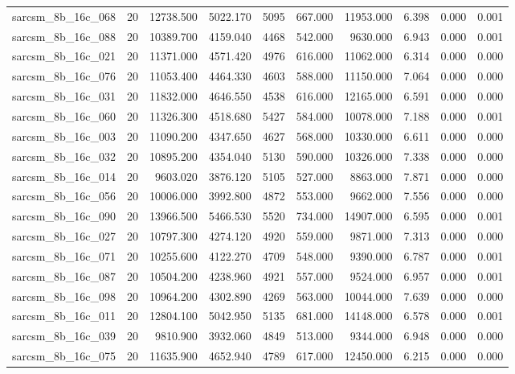 \begin{tabular}{lrrrrrrrrr}
sarcsm\_8b\_16c\_068 & 20 & 12738.500 & 5022.170 & 5095 & 667.000 & 11953.000 & 6.398 & 0.000 & 0.001 \\
sarcsm\_8b\_16c\_088 & 20 & 10389.700 & 4159.040 & 4468 & 542.000 & 9630.000 & 6.943 & 0.000 & 0.001 \\
sarcsm\_8b\_16c\_021 & 20 & 11371.000 & 4571.420 & 4976 & 616.000 & 11062.000 & 6.314 & 0.000 & 0.000 \\
sarcsm\_8b\_16c\_076 & 20 & 11053.400 & 4464.330 & 4603 & 588.000 & 11150.000 & 7.064 & 0.000 & 0.000 \\
sarcsm\_8b\_16c\_031 & 20 & 11832.000 & 4646.550 & 4538 & 616.000 & 12165.000 & 6.591 & 0.000 & 0.000 \\
sarcsm\_8b\_16c\_060 & 20 & 11326.300 & 4518.680 & 5427 & 584.000 & 10078.000 & 7.188 & 0.000 & 0.001 \\
sarcsm\_8b\_16c\_003 & 20 & 11090.200 & 4347.650 & 4627 & 568.000 & 10330.000 & 6.611 & 0.000 & 0.000 \\
sarcsm\_8b\_16c\_032 & 20 & 10895.200 & 4354.040 & 5130 & 590.000 & 10326.000 & 7.338 & 0.000 & 0.000 \\
sarcsm\_8b\_16c\_014 & 20 & 9603.020 & 3876.120 & 5105 & 527.000 & 8863.000 & 7.871 & 0.000 & 0.000 \\
sarcsm\_8b\_16c\_056 & 20 & 10006.000 & 3992.800 & 4872 & 553.000 & 9662.000 & 7.556 & 0.000 & 0.000 \\
sarcsm\_8b\_16c\_090 & 20 & 13966.500 & 5466.530 & 5520 & 734.000 & 14907.000 & 6.595 & 0.000 & 0.001 \\
sarcsm\_8b\_16c\_027 & 20 & 10797.300 & 4274.120 & 4920 & 559.000 & 9871.000 & 7.313 & 0.000 & 0.000 \\
sarcsm\_8b\_16c\_071 & 20 & 10255.600 & 4122.270 & 4709 & 548.000 & 9390.000 & 6.787 & 0.000 & 0.001 \\
sarcsm\_8b\_16c\_087 & 20 & 10504.200 & 4238.960 & 4921 & 557.000 & 9524.000 & 6.957 & 0.000 & 0.001 \\
sarcsm\_8b\_16c\_098 & 20 & 10964.200 & 4302.890 & 4269 & 563.000 & 10044.000 & 7.639 & 0.000 & 0.000 \\
sarcsm\_8b\_16c\_011 & 20 & 12804.100 & 5042.950 & 5135 & 681.000 & 14148.000 & 6.578 & 0.000 & 0.001 \\
sarcsm\_8b\_16c\_039 & 20 & 9810.900 & 3932.060 & 4849 & 513.000 & 9344.000 & 6.948 & 0.000 & 0.000 \\
sarcsm\_8b\_16c\_075 & 20 & 11635.900 & 4652.940 & 4789 & 617.000 & 12450.000 & 6.215 & 0.000 & 0.000 \\

\end{tabular}
